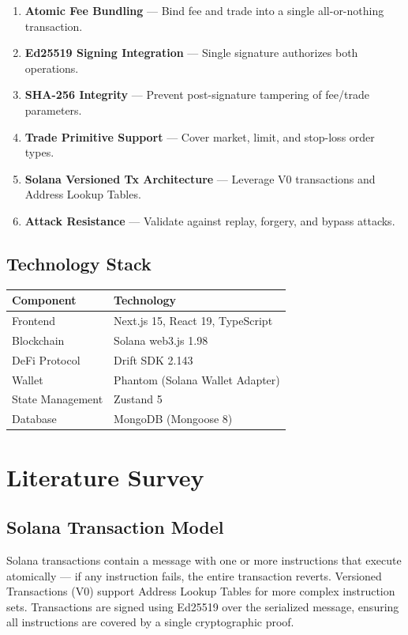 \documentclass[12pt,a4paper]{article}
\begin{document}
\begin{enumerate}
    \item \textbf{Atomic Fee Bundling} --- Bind fee and trade into a single all-or-nothing transaction.
    \item \textbf{Ed25519 Signing Integration} --- Single signature authorizes both operations.
    \item \textbf{SHA-256 Integrity} --- Prevent post-signature tampering of fee/trade parameters.
    \item \textbf{Trade Primitive Support} --- Cover market, limit, and stop-loss order types.
    \item \textbf{Solana Versioned Tx Architecture} --- Leverage V0 transactions and Address Lookup Tables.
    \item \textbf{Attack Resistance} --- Validate against replay, forgery, and bypass attacks.
\end{enumerate}

\subsection{Technology Stack}

\begin{center}
\begin{tabular}{l l}
\toprule
\textbf{Component} & \textbf{Technology} \\
\midrule
Frontend & Next.js 15, React 19, TypeScript \\
Blockchain & Solana web3.js 1.98 \\
DeFi Protocol & Drift SDK 2.143 \\
Wallet & Phantom (Solana Wallet Adapter) \\
State Management & Zustand 5 \\
Database & MongoDB (Mongoose 8) \\
\bottomrule
\end{tabular}
\end{center}

\section{Literature Survey}

\subsection{Solana Transaction Model}

Solana transactions contain a message with one or more instructions that execute atomically --- if any instruction fails, the entire transaction reverts. Versioned Transactions (V0) support Address Lookup Tables for more complex instruction sets. Transactions are signed using Ed25519 over the serialized message, ensuring all instructions are covered by a single cryptographic proof.
\end{document}

